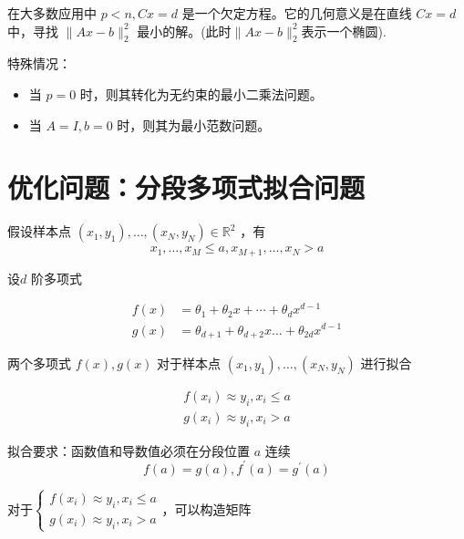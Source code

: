
在大多数应用中 $ p<n, C x=d $ 是一个欠定方程。它的几何意义是在直线 $ C x=d $ 中，寻找 $ \|A x-b\|_{2}^{2} $ 最小的解。(此时$\|A x-b\|_{2}^{2}$表示一个椭圆).

特殊情况：

\begin{itemize}
    \item 当 $ {p}=0 $ 时，则其转化为无约束的最小二乘法问题。
    \item 当 $ {A}=I, b=0 $ 时，则其为最小范数问题。
\end{itemize}




\section{优化问题：分段多项式拟合问题}

\begin{problem}
    假设样本点 $ \left(x_{1}, y_{1}\right), \ldots,\left(x_{N}, y_{N}\right) \in \mathbb{R}^{2} $ ，有 $$ x_{1}, \ldots, x_{M} \leq a , x_{M+1}, \ldots, x_{N}>a$$

    设$ {d} $ 阶多项式 

    $$
    \begin{aligned}
        f(x)&=\theta_{1}+\theta_{2} x+\cdots+\theta_{d} x^{d-1}\\
        g(x)&=\theta_{d+1}+\theta_{d+2} x \ldots+\theta_{2 d} x^{d-1}
    \end{aligned}
    $$

    两个多项式 $ f(x), g(x) $ 对于样本点 $ \left(x_{1}, y_{1}\right), \ldots,\left(x_{N}, y_{N}\right) $ 进行拟合

    $$
    \begin{array}{l}
    f\left(x_{i}\right) \approx y_{i}, x_{i} \leq a \\
    g\left(x_{i}\right) \approx y_{i}, x_{i}>a
    \end{array}
    $$

    拟合要求：函数值和导数值必须在分段位置 $ a $ 连续
    $$
    f(a)=g(a), f^{\prime}(a)=g^{\prime}(a)
    $$
\end{problem}

对于$
\left\{
    \begin{array}{l}
f\left(x_{i}\right) \approx y_{i}, x_{i} \leq a \\
g\left(x_{i}\right) \approx y_{i}, x_{i}>a
\end{array}
\right.
$，可以构造矩阵

